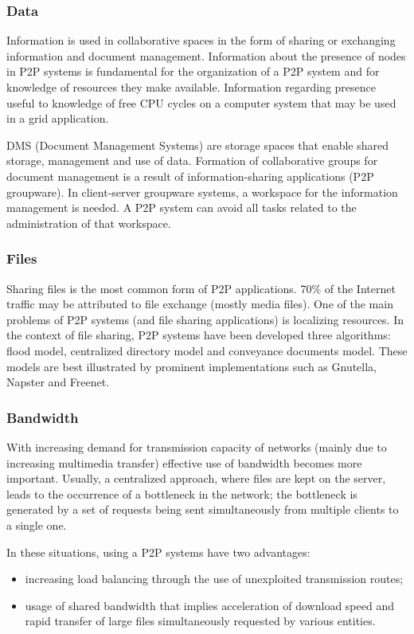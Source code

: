 \subsubsection{Data}

Information is used in collaborative spaces in the form of sharing or
exchanging information and document management. Information about the presence
of nodes in P2P systems is fundamental for the organization of a P2P system
and for knowledge of resources they make available. Information regarding
presence useful to knowledge of free CPU cycles on a computer system that may
be used in a grid application.

DMS (Document Management Systems) are storage spaces that enable shared
storage, management and use of data. Formation of collaborative groups for
document management is a result of information-sharing applications (P2P
groupware). In client-server groupware systems, a workspace for the
information management is needed. A P2P system can avoid all tasks related to
the administration of that workspace.

\subsubsection{Files}

Sharing files is the most common form of P2P applications. 70\% of the
Internet traffic may be attributed to file exchange (mostly media files). One
of the main problems of P2P systems (and file sharing applications) is
localizing resources. In the context of file sharing, P2P systems have been
developed three algorithms: flood model, centralized directory model and
conveyance documents model. These models are best illustrated by prominent
implementations such as Gnutella, Napster and Freenet.

\subsubsection{Bandwidth}

With increasing demand for transmission capacity of networks (mainly due to
increasing multimedia transfer) effective use of bandwidth becomes more
important. Usually, a centralized approach, where files are kept on the
server, leads to the occurrence of a bottleneck in the network; the
bottleneck is generated by a set of requests being sent simultaneously from
multiple clients to a single one.

In these situations, using a P2P systems have two advantages:
\begin{itemize}
  \item increasing load balancing through the use of unexploited transmission
  routes;
  \item usage of shared bandwidth that implies acceleration of download speed
  and rapid transfer of large files simultaneously requested by various
  entities.
\end{itemize}

